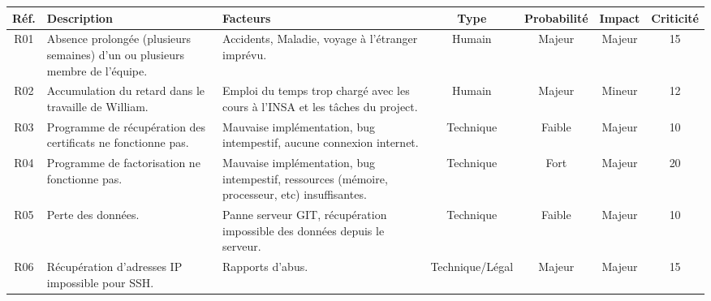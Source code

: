 \documentclass[a4paper,11pt,french]{article}
\begin{document}
\begin{center}
\begin{tabular}{|c|p{5cm}|p{3cm}|c|c|c|c|}
\hline
\textbf{Réf.} & \textbf{Description} & \textbf{Facteurs} & \textbf{Type} & \textbf{Probabilité} & \textbf{Impact} & \textbf{Criticité} \\
\hline
 R01 & Absence prolongée (plusieurs semaines) d'un ou plusieurs membre de l'équipe. &
 Accidents, Maladie, voyage à l'étranger imprévu. &
 Humain &
 Majeur &
 Majeur &
 15 \\
 \hline
 R02 & Accumulation du retard dans le travaille de William. &
 Emploi du temps trop chargé avec les cours à l'INSA et les tâches du project. &
 Humain &
 Majeur &
 Mineur &
 12 \\
 \hline
 R03 & Programme de récupération des certificats ne fonctionne pas. &
 Mauvaise implémentation, bug intempestif, aucune connexion internet.  &
 Technique &
 Faible &
 Majeur &
 10 \\
\hline
 R04 & Programme de factorisation ne fonctionne pas. &
 Mauvaise implémentation, bug intempestif, ressources (mémoire, processeur, etc) insuffisantes.  &
 Technique &
 Fort &
 Majeur &
 20 \\
\hline
 R05 & Perte des données. &
 Panne serveur GIT, récupération impossible des données depuis le serveur. &
 Technique &
 Faible &
 Majeur &
 10 \\
\hline
 R06 & Récupération d'adresses IP impossible pour SSH. &
 Rapports d'abus. &
 Technique/Légal &
 Majeur &
 Majeur &
 15 \\
\hline

\end{tabular}
\end{center}
\end{document}

